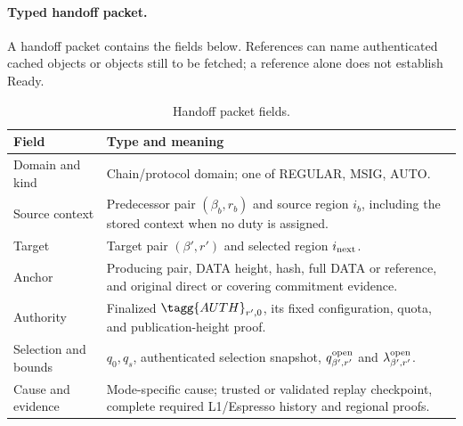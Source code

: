\paragraph{Typed handoff packet.}
A handoff packet contains the fields below. References can name
authenticated cached objects or objects still to be fetched; a reference
alone does not establish Ready.
\begin{table}[htbp]\centering\small
\caption{Handoff packet fields.}
\label{tab:handoff-packet}
\begin{tabularx}{\linewidth}{@{}p{.26\linewidth}Y@{}}\toprule
Field & Type and meaning\\\midrule
Domain and kind & Chain/protocol domain; one of REGULAR, MSIG, AUTO.\\
Source context & Predecessor pair $(\beta_b,r_b)$ and source region
$i_b$, including the stored context when no duty is assigned.\\
Target & Target pair $(\beta',r')$ and selected region $i_{\rm next}$.\\
Anchor & Producing pair, DATA height, hash, full DATA or reference,
and original direct or covering commitment evidence.\\
Authority & Finalized $\tagg{AUTH}_{r',0}$, its fixed configuration,
quota, and publication-height proof.\\
Selection and bounds & $q_0,q_s$, authenticated selection snapshot,
$q^{\rm open}_{\beta',r'}$ and $\lambda^{\rm open}_{\beta',r'}$.\\
Cause and evidence & Mode-specific cause; trusted or validated replay
checkpoint, complete required L1/Espresso history and regional proofs.\\\bottomrule
\end{tabularx}
\end{table}

